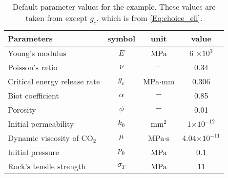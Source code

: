 \begin{table}[htbp]
    \centering
    \caption{Default parameter values for the example. These values are taken from \cite{wang2018influence} except $g_c$, which is from \eqref{Eq:choice_ell}.}

    \begin{tabular}{l c c c}
    \hline 
         Parameters & symbol & unit& value \\
    \hline 
         Young's modulus & $E$ &MPa&  6 $\times 10^{3}$\\
         Poisson's ratio & $\nu$ &$-$&  0.34\\
         Critical energy release rate & $g_c$ &MPa$\cdot$mm&  0.306\\
         Biot coefficient & $\alpha$ &$-$&  0.85\\
         Porosity & $\phi$ &$-$&  0.01\\
         Initial permeability & $k_0$ &mm$^2$&  1$\times 10^{-12}$\\
         Dynamic viscosity of {CO}$_2$ & $\mu$ & MPa$\cdot$s& 4.04$\times 10^{-11}$\\
         Initial pressure & $p_0$ &MPa& 0.1\\
         Rock's tensile strength & $\sigma_T$ &MPa& 11\\

    \hline     
    \end{tabular}
    \label{Tab:Gas_input}
\end{table}





